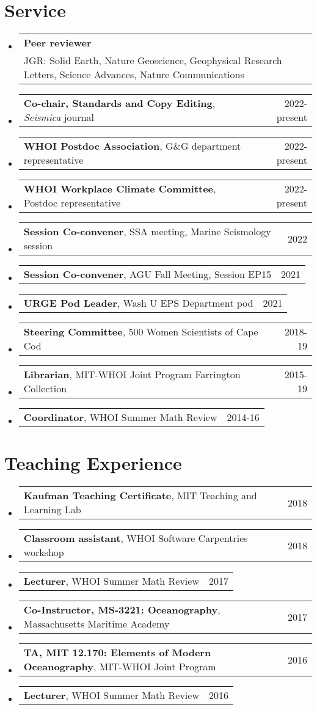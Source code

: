 \documentclass[letterpaper,11pt]{article}
\makeatletter
\newcommand{\resumeField}[3]{
  \vspace{-2pt}\item
    \begin{tabular*}{0.97\textwidth}[t]{l@{\extracolsep{\fill}}r}
      \textbf{#1} & #2 \\
      \small#3\\
    \end{tabular*}\vspace{-7pt}
}
\newcommand{\resumeSmallThing}[3]{
  \vspace{-2pt}\item
    \begin{tabular*}{0.97\textwidth}[t]{l@{\extracolsep{\fill}}r}
      \textbf{#1}, {#2} & #3\\
    \end{tabular*}\vspace{-14pt}
}
\newcommand{\resumeSubHeadingListStart}{\begin{itemize}[leftmargin=0.15in, label={}]}
\newcommand{\resumeSubHeadingListEnd}{\end{itemize}}
\makeatother
\begin{document}
\section{Service}
    \resumeSubHeadingListStart
    \resumeField
      {Peer reviewer}{}  %
      {JGR: Solid Earth, Nature Geoscience, Geophysical Research Letters, Science Advances, Nature Communications}
    \resumeSmallThing
      {Co-chair, Standards and Copy Editing}{\textit{Seismica} journal}{2022-present}
    \resumeSmallThing
      {WHOI Postdoc Association}{G\&G department representative}{2022-present}
    \resumeSmallThing
      {WHOI Workplace Climate Committee}{Postdoc representative}{2022-present}
    \resumeSmallThing
      {Session Co-convener}{SSA meeting, Marine Seismology session}{2022}
    \resumeSmallThing
      {Session Co-convener}{AGU Fall Meeting, Session EP15}{2021}
    \resumeSmallThing
      {URGE Pod Leader}{Wash U EPS Department pod}{2021}
    \resumeSmallThing
      {Steering Committee}{500 Women Scientists of Cape Cod}{2018-19}
    \resumeSmallThing
      {Librarian}{MIT-WHOI Joint Program Farrington Collection}{2015-19}
    \resumeSmallThing
      {Coordinator}{WHOI Summer Math Review}{2014-16}
    \resumeSubHeadingListEnd


\section{Teaching Experience}
  \resumeSubHeadingListStart
    \resumeSmallThing
      {Kaufman Teaching Certificate}{MIT Teaching and Learning Lab}{2018}
    \resumeSmallThing
      {Classroom assistant}{WHOI Software Carpentries workshop}{2018}
    \resumeSmallThing
      {Lecturer}{WHOI Summer Math Review}{2017}
    \resumeSmallThing
      {Co-Instructor, MS-3221: Oceanography}{Massachusetts Maritime Academy}{2017}
    \resumeSmallThing
      {TA, MIT 12.170: Elements of Modern Oceanography}{MIT-WHOI Joint Program}{2016}
    \resumeSmallThing
      {Lecturer}{WHOI Summer Math Review}{2016}
  \resumeSubHeadingListEnd


\end{document}
